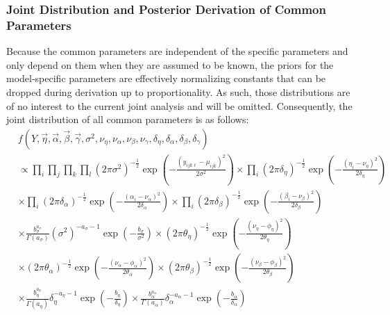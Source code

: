 \subsubsection{Joint Distribution and Posterior Derivation of Common Parameters}
Because the common parameters are independent of the specific
parameters and only depend on them when they are assumed to be known,
the priors for the model-specific parameters are effectively
normalizing constants that can be dropped during derivation up to
proportionality.  As such, those distributions are of no interest to
the current joint analysis and will be omitted.  Consequently, the
joint distribution of all common parameters is as follows:\\
\begin{eqnarray*}
&f\left(Y,\vec{\eta},\vec{\alpha},\vec{\beta},\vec{\gamma},\sigma^2,
\nu_{\eta},\nu_{\alpha},\nu_{\beta},\nu_{\gamma},\delta_{\eta},\delta_{\alpha},
\delta_{\beta},\delta_{\gamma}\right)&\\
&\displaystyle{\propto\prod_{i}\prod_{j}\prod_{k}\prod_{l}\left(2\pi\sigma^2\right)^{-\frac{1}{2}}\exp\left(-\frac{\left(y_{ijk\ell}-\mu_{ijk}\right)^2}{2\sigma^2}\right)
\times\prod_i\left(2\pi\delta_{\eta}\right)^{-\frac{1}{2}}\exp\left(-\frac{\left(\eta_i-\nu_{\eta}\right)^2}{2\delta_{\eta}}\right)}&\\
&\displaystyle{\times\prod_i\left(2\pi\delta_{\alpha}\right)^{-\frac{1}{2}}\exp\left(-\frac{\left(\alpha_i-\nu_{\alpha}\right)^2}{2\delta_{\alpha}}\right)
\times\prod_i\left(2\pi\delta_{\beta}\right)^{-\frac{1}{2}}\exp\left(-\frac{\left(\beta_i-\nu_{\beta}\right)^2}{2\delta_{\beta}}\right)}&\\
&\displaystyle{\times\frac{b_{\sigma}^{a_{\sigma}}}{\Gamma\left(a_{\sigma}\right)}\left(\sigma^2\right)^{-a_{\sigma}-1}\exp\left(-\frac{b_{\sigma}}{\sigma^2}\right)
\times\left(2\pi\theta_{\eta}\right)^{-\frac{1}{2}}\exp\left(-\frac{\left(\nu_{\eta}-\phi_{\eta}\right)^2}{2\theta_{\eta}}\right)}&\\
&\displaystyle{\times\left(2\pi\theta_{\alpha}\right)^{-\frac{1}{2}}\exp\left(-\frac{\left(\nu_{\alpha}-\phi_{\alpha}\right)^2}{2\theta_{\alpha}}\right)
\times\left(2\pi\theta_{\beta}\right)^{-\frac{1}{2}}\exp\left(-\frac{\left(\nu_{\beta}-\phi_{\beta}\right)^2}{2\theta_{\beta}}\right)}&\\
&\displaystyle{
\times\frac{b_{\eta}^{a_{\eta}}}{\Gamma\left(a_{\eta}\right)}\delta_{\eta}^{-a_{\eta}-1}\exp\left(-\frac{b_{\eta}}{\delta_{\eta}}\right)
\times\frac{b_{\alpha}^{a_{\alpha}}}{\Gamma\left(a_{\alpha}\right)}\delta_{\alpha}^{-a_{\alpha}-1}\exp\left(-\frac{b_{\alpha}}{\delta_{\alpha}}\right)
}
\end{eqnarray*}
